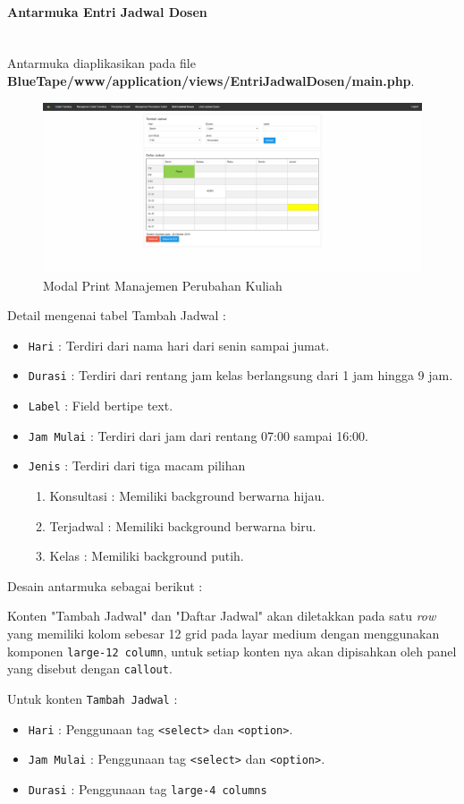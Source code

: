 \documentclass[a4paper,twoside]{article}
\newcommand{\myparagraph}[1]{\paragraph{#1}\mbox{}\\}
\begin{document}
\begin{enumerate}
		\myparagraph{Antarmuka Entri Jadwal Dosen}
		Antarmuka diaplikasikan pada file \textbf{BlueTape/www/application/views/EntriJadwalDosen/main.php}.
		\begin{figure} [H]
			\centering  
			\includegraphics[scale=0.5]{Tampilan-Entri-Jadwal-Dosen.png}  
			\caption{Modal Print Manajemen Perubahan Kuliah} 
		\end{figure}
		
		Detail mengenai tabel Tambah Jadwal :
		\begin{itemize}
			\item \texttt{Hari} : Terdiri dari nama hari dari senin sampai jumat.
			\item \texttt{Durasi} : Terdiri dari rentang jam kelas berlangsung dari 1 jam hingga 9 jam.
			\item \texttt{Label} : Field bertipe text.
			\item \texttt{Jam Mulai} : Terdiri dari jam dari rentang 07:00 sampai 16:00.
			\item \texttt{Jenis} : Terdiri dari tiga macam pilihan 
			\begin{enumerate}
				\item Konsultasi : Memiliki background berwarna hijau.
				\item Terjadwal : Memiliki background berwarna biru.
				\item Kelas : Memiliki background putih.
			\end{enumerate}
		\end{itemize}
		
		Desain antarmuka sebagai berikut : \par
		Konten "Tambah Jadwal" dan "Daftar Jadwal" akan diletakkan pada satu \textit{row} yang memiliki kolom sebesar 12 grid pada layar medium dengan menggunakan komponen \colorbox{mygray}{\texttt{large-12 column}}, untuk setiap konten nya akan dipisahkan oleh panel yang disebut dengan \colorbox{mygray}{\texttt{callout}}. \par
		Untuk konten \texttt{Tambah Jadwal} :
		\begin{itemize}
			\item \texttt{Hari} : Penggunaan tag \colorbox{mygray}{\texttt{<select>}} dan \colorbox{mygray}{\texttt{<option>}}.
			\item \texttt{Jam Mulai} : Penggunaan tag \colorbox{mygray}{\texttt{<select>}} dan \colorbox{mygray}{\texttt{<option>}}.
			\item \texttt{Durasi} : Penggunaan tag \colorbox{mygray}{\texttt{large-4 columns}}
		\end{itemize}
		

\end{enumerate}
\end{document}
